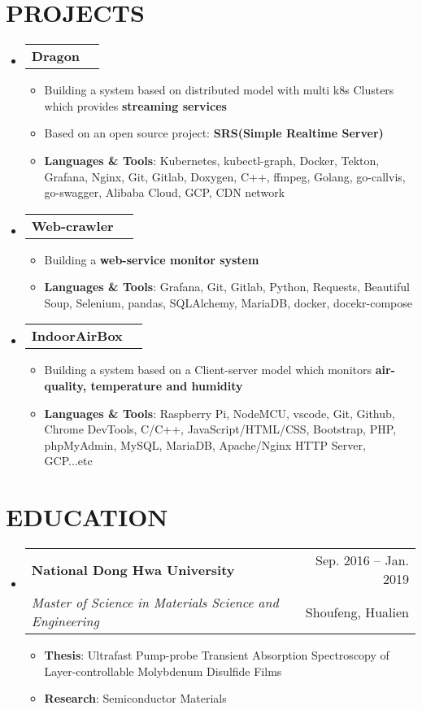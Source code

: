 \documentclass[letterpaper,11pt]{article}
\makeatletter
\newcommand{\resumeItem}[1]{
  \item\small{
    {#1 \vspace{-1pt}}
  }
}
\newcommand{\resumeSubheading}[4]{
  \vspace{-1pt}\item
    \begin{tabular*}{\textwidth}[t]{l@{\extracolsep{\fill}}r}
      \textbf{#1} & {\color{dark-grey}\small #2}\vspace{1pt}\\ %
      \textit{#3} & {\color{dark-grey} \small #4}\\ %
    \end{tabular*}\vspace{-4pt}
}
\newcommand{\resumeProjectHeading}[2]{
    \item
    \begin{tabular*}{\textwidth}{l@{\extracolsep{\fill}}r}
      #1 & {\color{dark-grey}} \\
    \end{tabular*}\vspace{-4pt}
}
\newcommand{\resumeSubHeadingListStart}{\begin{itemize}[leftmargin=0in, label={}]}
\newcommand{\resumeSubHeadingListEnd}{\end{itemize}}
\newcommand{\resumeItemListStart}{\begin{itemize}}
\newcommand{\resumeItemListEnd}{\end{itemize}\vspace{0pt}}
\makeatother
\begin{document}
\section{PROJECTS}
    \resumeSubHeadingListStart
    \resumeProjectHeading
        {\textbf{Dragon}} {Dec. 2022 -- Present}
        \resumeItemListStart
          \resumeItem{Building a system based on distributed model with multi k8s Clusters which provides \textbf{streaming services}}
          \resumeItem{Based on an open source project: \textbf{SRS(Simple Realtime Server)}}
          \resumeItem{ \textbf{Languages \& Tools}: Kubernetes, kubectl-graph, Docker, Tekton, Grafana, Nginx, Git, Gitlab, Doxygen, C++, ffmpeg, Golang, go-callvis, go-swagger, Alibaba Cloud, GCP, CDN network}
        \resumeItemListEnd          
    \resumeSubHeadingListEnd

    \resumeSubHeadingListStart
      \resumeProjectHeading
          {\textbf{Web-crawler}} {Apr. 2022 -- Jun. 2022}
          \resumeItemListStart
            \resumeItem{Building a \textbf{web-service monitor system}}
            \resumeItem{ \textbf{Languages \& Tools}: Grafana, Git, Gitlab, Python, Requests, Beautiful Soup, Selenium, pandas, SQLAlchemy, MariaDB, docker, docekr-compose}
          \resumeItemListEnd          
    \resumeSubHeadingListEnd

    \resumeSubHeadingListStart
      \resumeProjectHeading
          {\textbf{IndoorAirBox}} {Jan. 2021 -- May. 2021}
          \resumeItemListStart
            \resumeItem{Building a system based on a Client-server model which monitors \textbf{air-quality, temperature and humidity}}
            \resumeItem{ \textbf{Languages \& Tools}: Raspberry Pi, NodeMCU, vscode, Git, Github, Chrome DevTools, C/C++, JavaScript/HTML/CSS, Bootstrap, PHP, phpMyAdmin, MySQL, MariaDB, Apache/Nginx HTTP Server, GCP...etc}
          \resumeItemListEnd          
    \resumeSubHeadingListEnd



\section {EDUCATION}
\resumeSubHeadingListStart
\resumeSubheading
  {National Dong Hwa University}{Sep. 2016 -- Jan. 2019}
  {Master of Science in Materials Science and Engineering}{Shoufeng, Hualien}
    \resumeItemListStart
  \resumeItem {\textbf{Thesis}: Ultrafast Pump-probe Transient Absorption Spectroscopy of Layer-controllable Molybdenum Disulfide Films}
    \resumeItem 
        {\textbf{Research}: Semiconductor Materials }
    \resumeItemListEnd
\resumeSubHeadingListEnd
\end{document}
